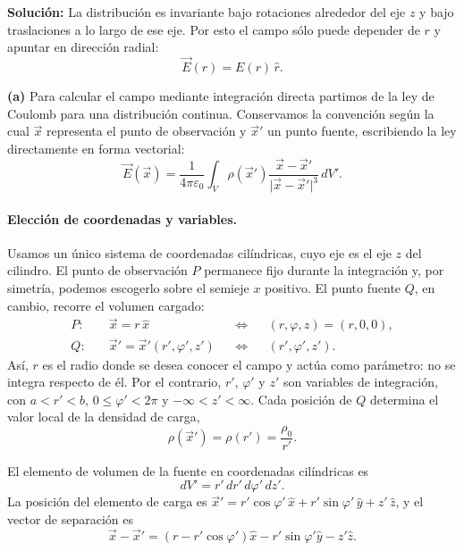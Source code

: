 \documentclass[11pt]{article}
\newcommand{\inciso}[1]{%
  \vspace{0.35em}
  \noindent\textbf{(#1)}\enspace}
\begin{document}
\textbf{Solución:} La distribución es invariante bajo rotaciones alrededor del eje
$z$ y bajo traslaciones a lo largo de ese eje. Por esto el campo sólo puede depender
de $r$ y apuntar en dirección radial:
\begin{equation*}
\vec E(r)=E(r)\,\hat{r}.
\end{equation*}

\inciso{a} Para calcular el campo mediante integración directa partimos de la ley
de Coulomb para una distribución continua. Conservamos la convención según la cual $\vec{x}$ representa el punto de observación y
$\vec{x}'$ un punto fuente, escribiendo la ley directamente en
forma vectorial:
\begin{equation}
\vec E(\vec{x})=
\frac{1}{4\pi\varepsilon_0}
\int_V
\rho(\vec{x}')
\frac{\vec{x}-\vec{x}'}{\lvert\vec{x}-\vec{x}'\rvert^3}\,dV'.
\end{equation}

\paragraph{Elección de coordenadas y variables.}
Usamos un único sistema de coordenadas cilíndricas, cuyo eje es el eje $z$ del
cilindro. El punto de observación $P$ permanece fijo durante la integración y, por
simetría, podemos escogerlo sobre el semieje $x$ positivo. El punto fuente $Q$, en
cambio, recorre el volumen cargado:
\[
\begin{aligned}
P:&\quad \vec{x}=r\,\hat{x}
&&\Longleftrightarrow &&(r,\varphi,z)=(r,0,0),\\
Q:&\quad \vec{x}'=\vec{x}'(r',\varphi',z')
&&\Longleftrightarrow &&(r',\varphi',z').
\end{aligned}
\]
Así, $r$ es el radio donde se desea conocer el campo y actúa como parámetro: no se
integra respecto de él. Por el contrario, $r'$, $\varphi'$ y $z'$ son variables de
integración, con $a<r'<b$, $0\leq\varphi'<2\pi$ y
$-\infty<z'<\infty$. Cada posición de $Q$ determina el valor local de la densidad
de carga,
\[
\rho(\vec{x}')=\rho(r')=\frac{\rho_0}{r'}.
\]

El elemento de volumen de la fuente en coordenadas cilíndricas es
\begin{equation}
dV'=r'\,dr'\,d\varphi'\,dz'.
\end{equation}
La posición del elemento de carga es
$\vec{x}'=r'\cos\varphi'\,\hat{x}
+r'\sin\varphi'\,\hat{y}+z'\,\hat{z}$, y el vector de separación es
\begin{equation}
\vec{x}-\vec{x}'=
(r-r'\cos\varphi')\hat{x}
-r'\sin\varphi'\hat{y}-z'\hat{z}.
\end{equation}
\end{document}
